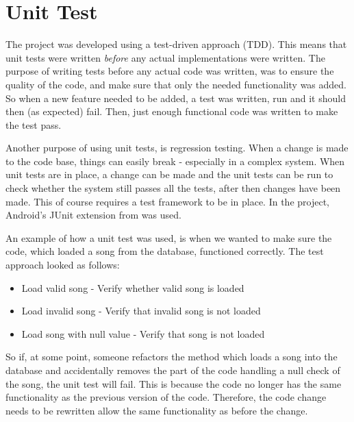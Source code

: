 \section{Unit Test}

The project was developed using a test-driven approach (TDD). This means that unit tests were written \textit{before} any actual implementations were written. The purpose of writing tests before any actual code was written, was to ensure the quality of the code, and make sure that only the needed functionality was added. So when a new feature needed to be added, a test was written, run and it should then (as expected) fail. Then, just enough functional code was written to make the test pass. 

Another purpose of using unit tests, is regression testing. When a change is made to the code base, things can easily break - especially in a complex system. When unit tests are in place, a change can be made and the unit tests can be run to check whether the system still passes all the tests, after then changes have been made. This of course requires a test framework to be in place. In the project, Android's JUnit extension from \citet{android:test} was used.

An example of how a unit test was used, is when we wanted to make sure the code, which loaded a song from the database, functioned correctly. The test approach looked as follows:

\begin{itemize}
\item Load valid song
\subitem- Verify whether valid song is loaded
\item Load invalid song
\subitem- Verify that invalid song is not loaded
\item Load song with null value
\subitem- Verify that song is not loaded
\end{itemize} 

So if, at some point, someone refactors the method which loads a song into the database and accidentally removes the part of the code handling a null check of the song, the unit test will fail. This is because the code no longer has the same functionality as the previous version of the code. Therefore, the code change needs to be rewritten allow the same functionality as before the change.

